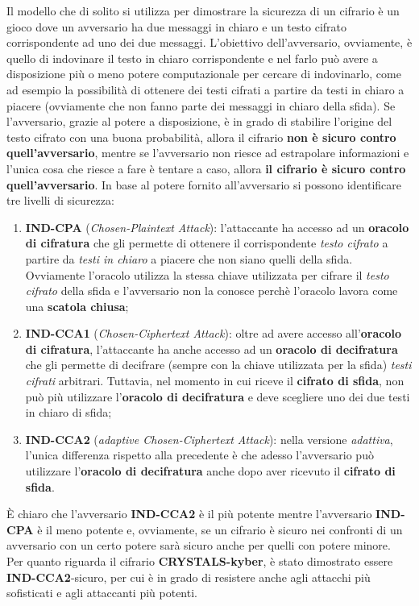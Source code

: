 Il modello che di solito si utilizza per dimostrare la sicurezza di un cifrario è un gioco dove un avversario ha due messaggi in chiaro e un testo cifrato corrispondente ad uno dei due messaggi. L'obiettivo dell'avversario, ovviamente, è quello di indovinare il testo in chiaro corrispondente e nel farlo può avere a disposizione più o meno potere computazionale per cercare di indovinarlo, come ad esempio la possibilità di ottenere dei testi cifrati a partire da testi in chiaro a piacere (ovviamente che non fanno parte dei messaggi in chiaro della sfida). Se l'avversario, grazie al potere a disposizione, è in grado di stabilire l'origine del testo cifrato con una buona probabilità, allora il cifrario \textbf{non è sicuro contro quell'avversario}, mentre se l'avversario non riesce ad estrapolare informazioni e l'unica cosa che riesce a fare è tentare a caso, allora \textbf{il cifrario è sicuro contro quell'avversario}. In base al potere fornito all'avversario si possono identificare tre livelli di sicurezza:  

\begin{enumerate}
    \item \textbf{IND-CPA} (\emph{Chosen-Plaintext Attack}): l'attaccante ha accesso ad un \textbf{oracolo di cifratura} che gli permette di ottenere il corrispondente \emph{testo cifrato} a partire da \emph{testi in chiaro} a piacere che non siano quelli della sfida. Ovviamente l'oracolo utilizza la stessa chiave utilizzata per cifrare il \emph{testo cifrato} della sfida e l'avversario non la conosce perchè l'oracolo lavora come una \textbf{scatola chiusa};
    \item \textbf{IND-CCA1} (\emph{Chosen-Ciphertext Attack}): oltre ad avere accesso all'\textbf{oracolo di cifratura}, l'attaccante ha anche accesso ad un \textbf{oracolo di decifratura} che gli permette di decifrare (sempre con la chiave utilizzata per la sfida) \emph{testi cifrati} arbitrari. Tuttavia, nel momento in cui riceve il \textbf{cifrato di sfida}, non può più utilizzare l'\textbf{oracolo di decifratura} e deve scegliere uno dei due testi in chiaro di sfida;
    \item \textbf{IND-CCA2} (\emph{adaptive Chosen-Ciphertext Attack}): nella versione \emph{adattiva}, l'unica differenza rispetto alla precedente è che adesso l'avversario può utilizzare l'\textbf{oracolo di decifratura} anche dopo aver ricevuto il \textbf{cifrato di sfida}.
\end{enumerate}

È chiaro che l'avversario \textbf{IND-CCA2} è il più potente mentre l'avversario \textbf{IND-CPA} è il meno potente e, ovviamente, se un cifrario è sicuro nei confronti di un avversario con un certo potere sarà sicuro anche per quelli con potere minore. \cite{wikipedia_cipher_security}\\
Per quanto riguarda il cifrario \textbf{CRYSTALS-kyber}, è stato dimostrato essere \textbf{IND-CCA2}-sicuro, per cui è in grado di resistere anche agli attacchi più sofisticati e agli attaccanti più potenti. \cite{kyber}

